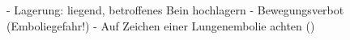 
\begin{itemize}
  -   Lagerung:  liegend, betroffenes Bein hochlagern
  -   Bewegungsverbot (Emboliegefahr!)
  -   Auf Zeichen einer Lungenembolie achten ()
\end{itemize}